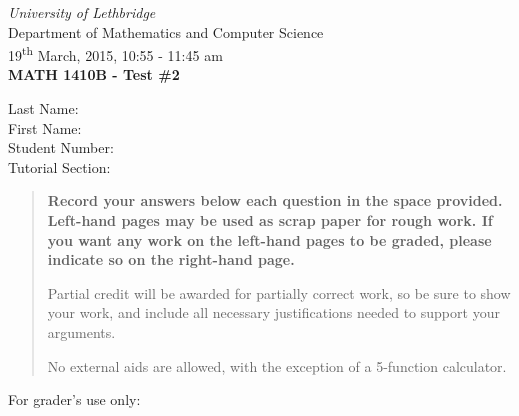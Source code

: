 \documentclass[12pt]{article}
\newcommand{\skipline}{\vspace{12pt}}
\begin{document}
\author{Instructor: Sean Fitzpatrick}
\thispagestyle{plain}
\begin{center}
\emph{University of Lethbridge}\\
Department of Mathematics and Computer Science\\
19\textsuperscript{th} March, 2015, 10:55 - 11:45 am\\
{\bf MATH 1410B - Test \#2}\\
\end{center}
\skipline \skipline \skipline \noindent \skipline
Last Name:\underline{\hspace{353pt}}\\
\skipline
First Name:\underline{\hspace{350pt}}\\
\skipline
Student Number:\underline{\hspace{323pt}}\\
\skipline
Tutorial Section: \underline{\hspace{320pt}}\\


\vspace{0.5in}


\begin{quote}
 {\bf Record your answers below each question in the space provided.    Left-hand pages may be used as scrap paper for rough work.  If you want any work on the left-hand pages to be graded, please indicate so on the right-hand page.
 
 \bigskip
 
Partial credit will be awarded for partially correct work, so be sure to show your work, and include all necessary justifications needed to support your arguments.

\bigskip

No external aids are allowed, with the exception of a 5-function calculator.}
\end{quote}


\vspace{0.5in}

For grader's use only:
\end{document}
